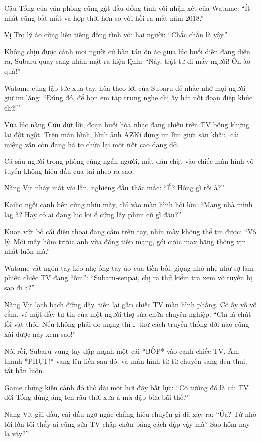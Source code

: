 \documentclass[../main.tex]{subfiles}
\begin{document}
Cậu Tổng của văn phòng cũng gật đầu đồng tình với nhận xét của Watame: ``Ít nhất cũng bắt mắt và hợp thời hơn so với hồi ra mắt năm 2018.''

Vị Trợ lý ảo cũng liền tiếng đồng tình với hai người: ``Chắc chắn là vậy.''

Không chịu được cảnh mọi người cứ bàn tán ồn ào giữa lúc buổi diễn đang diễn ra, Subaru quay sang nhăn mặt ra hiệu lệnh: ``Này, trật tự đi mấy người! Ồn ào quá!''

Watame cũng lập tức xua tay, hùa theo lời của Subaru để nhắc nhở mọi người giữ im lặng: ``Đúng đó, để bọn em tập trung nghe chị ấy hát nốt đoạn điệp khúc chứ!''

Vừa lúc nàng Cừu dứt lời, đoạn buổi hòa nhạc đang chiếu trên TV bỗng khựng lại đột ngột. Trên màn hình, hình ảnh AZKi đứng im lìm giữa sân khấu, cái miệng vẫn còn đang há to chừa lại một nốt cao dang dở.

Cả sáu người trong phòng cùng ngẩn người, mắt dán chặt vào chiếc màn hình vô tuyến không hiểu đầu cua tai nheo ra sao.

Nàng Vịt nháy mắt vài lần, nghiêng đầu thắc mắc: ``Ể? Hỏng gì rồi à?''

Kaiho ngồi cạnh bên cũng nhíu mày, chỉ vào màn hình hỏi lớn: ``Mạng nhà mình lag à? Hay có ai đang lục lọi ổ cứng lấy phim cũ gì đâu?''

Kuon vứt bỏ cái điện thoại đang cầm trên tay, nhíu mày không thể tin được: ``Vô lý. Mới mấy hôm trước anh vừa đóng tiền mạng, gói cước max băng thông xịn nhất luôn mà.''

Watame vắt ngón tay kéo nhẹ ống tay áo của tiền bối, giọng nhỏ nhẹ như sợ làm phiền chiếc TV đang ``ốm'': ``Subaru-senpai, chị ra thử kiểm tra xem vô tuyến bị sao đi ạ?''

Nàng Vịt lạch bạch đứng dậy, tiến lại gần chiếc TV màn hình phẳng. Cô ấy vỗ vỗ cằm, vẻ mặt đầy tự tin của một người thợ sửa chữa chuyên nghiệp: ``Chỉ là chút lỗi vặt thôi. Nếu không phải do mạng thì\dots\ thử cách truyền thống đời nào cũng xài được này xem sao!''

Nói rồi, Subaru vung tay đập mạnh một cái *BỐP* vào cạnh chiếc TV. Âm thanh *PHỤT!* vang lên liền sau đó, và màn hình từ từ chuyển sang đen thui, tắt hẳn luôn.

Game chứng kiến cảnh đó thở dài một hơi đầy bất lực: ``Cô tưởng đó là cái TV đời Tống dùng ăng-ten râu thời xưa à mà đập bừa bãi thế?''

Nàng Vịt gãi đầu, cái đầu ngơ ngác chẳng hiểu chuyện gì đã xảy ra: ``Ủa? Từ nhỏ tới lớn tôi thấy ai cũng sửa TV chập chờn bằng cách đập vậy mà? Sao hôm nay lạ vậy?''
\end{document}
